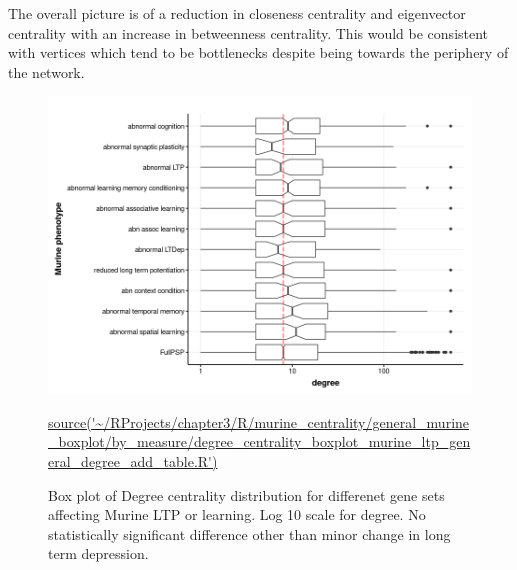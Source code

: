The overall picture is of a reduction in closeness centrality and eigenvector centrality with an increase in betweenness centrality. This would be consistent with vertices which tend to be bottlenecks despite being towards the periphery of the network. 






\begin{figure}
    \centering
    \includegraphics[width=\textwidth]{images/chapter3/ggplot2/murine_centrality_boxplot/add_theme/addLTP/Rplot_murine_degree_ltp.png}
    \caption{Box plot of Degree centrality distribution for differenet gene sets affecting Murine LTP or learning. Log 10 scale for degree. No statistically significant difference other than minor change in long term depression.} 
    \tiny\url{source('~/RProjects/chapter3/R/murine_centrality/general_murine_boxplot/by_measure/degree_centrality_boxplot_murine_ltp_general_degree_add_table.R')}
    \label{fig:murine_ltp_centrality_boxplot_degree1}
\end{figure}





